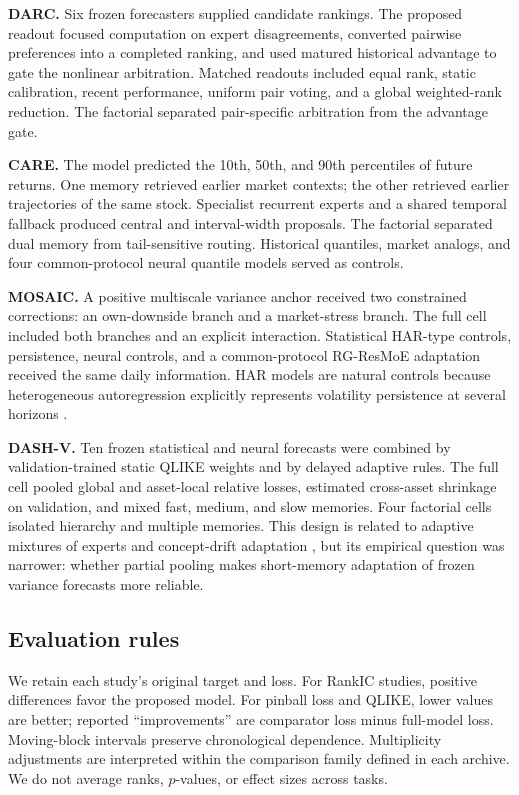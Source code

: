 \documentclass{crebss}
\begin{document}
\textbf{DARC.} Six frozen forecasters supplied candidate rankings. The proposed readout focused computation on expert disagreements, converted pairwise preferences into a completed ranking, and used matured historical advantage to gate the nonlinear arbitration. Matched readouts included equal rank, static calibration, recent performance, uniform pair voting, and a global weighted-rank reduction. The factorial separated pair-specific arbitration from the advantage gate.

\textbf{CARE.} The model predicted the 10th, 50th, and 90th percentiles of future returns. One memory retrieved earlier market contexts; the other retrieved earlier trajectories of the same stock. Specialist recurrent experts and a shared temporal fallback produced central and interval-width proposals. The factorial separated dual memory from tail-sensitive routing. Historical quantiles, market analogs, and four common-protocol neural quantile models served as controls.

\textbf{MOSAIC.} A positive multiscale variance anchor received two constrained corrections: an own-downside branch and a market-stress branch. The full cell included both branches and an explicit interaction. Statistical HAR-type controls, persistence, neural controls, and a common-protocol RG-ResMoE adaptation \citep{ye2026rgresmoe} received the same daily information. HAR models are natural controls because heterogeneous autoregression explicitly represents volatility persistence at several horizons \citep{corsi2009har}.

\textbf{DASH-V.} Ten frozen statistical and neural forecasts were combined by validation-trained static QLIKE weights and by delayed adaptive rules. The full cell pooled global and asset-local relative losses, estimated cross-asset shrinkage on validation, and mixed fast, medium, and slow memories. Four factorial cells isolated hierarchy and multiple memories. This design is related to adaptive mixtures of experts \citep{jacobs1991mixtures} and concept-drift adaptation \citep{gama2014drift}, but its empirical question was narrower: whether partial pooling makes short-memory adaptation of frozen variance forecasts more reliable.

\subsection{Evaluation rules}

We retain each study's original target and loss. For RankIC studies, positive differences favor the proposed model. For pinball loss and QLIKE, lower values are better; reported ``improvements'' are comparator loss minus full-model loss. Moving-block intervals preserve chronological dependence. Multiplicity adjustments are interpreted within the comparison family defined in each archive. We do not average ranks, $p$-values, or effect sizes across tasks.
\end{document}
